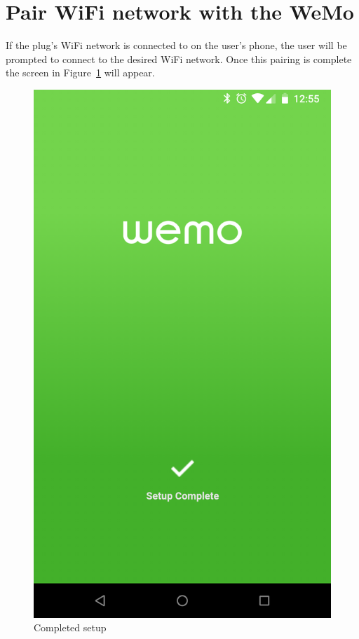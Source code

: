 \section{Pair WiFi network with the WeMo}
If the plug's WiFi network is connected to on the user's phone, the user will be prompted to connect to the desired WiFi network. Once this pairing is complete the screen in Figure~\ref{fig:completedSetup} will appear.
\begin{figure}[H]
\centering
\includegraphics[scale=0.09]{figs/wemoApp/setupComplete.png}
\caption{Completed setup}
\label{fig:completedSetup}
\end{figure}

